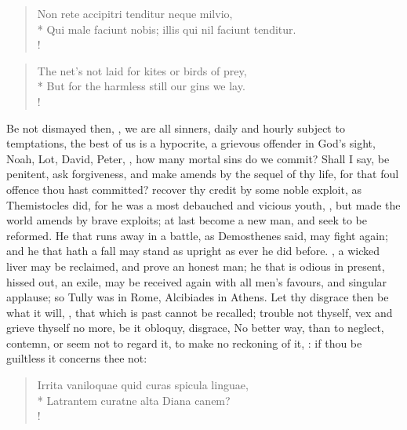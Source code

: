 {
\begin{latin}%
\begin{verse}%
Non rete accipitri tenditur neque milvio,\\*
Qui male faciunt nobis; illis qui nil faciunt tenditur.\\!
\end{verse}%
\end{latin}%
\translationrule%
\begin{verse}%
The net's not laid for kites or birds of prey,\\*
But for the harmless still our gins we lay.\\!
\end{verse}

Be not dismayed then, , we are all sinners, daily and hourly subject to temptations, the best of us is a hypocrite, a grievous offender in God's sight, Noah, Lot, David, Peter, \etc{}, how many mortal sins do we commit? Shall I say, be penitent, ask forgiveness, and make amends by the sequel of thy life, for that foul offence thou hast committed? recover thy credit by some noble exploit, as Themistocles did, for he was a most debauched and vicious youth, , but made the world amends by brave exploits; at last become a new man, and seek to be reformed. He that runs away in a battle, as Demosthenes said, may fight again; and he that hath a fall may stand as upright as ever he did before. , a wicked liver may be reclaimed, and prove an honest man; he that is odious in present, hissed out, an exile, may be received again with all men's favours, and singular applause; so Tully was in Rome, Alcibiades in Athens. Let thy disgrace then be what it will, , that which is past cannot be recalled; trouble not thyself, vex and grieve thyself no more, be it obloquy, disgrace, \etc{} No better way, than to neglect, contemn, or seem not to regard it, to make no reckoning of it, : if thou be guiltless it concerns thee not:

\begin{latin}
\begin{verse}%
Irrita vaniloquae quid curas spicula linguae,\\*
Latrantem curatne alta Diana canem?\\!
\end{verse}%
\end{latin}

}
